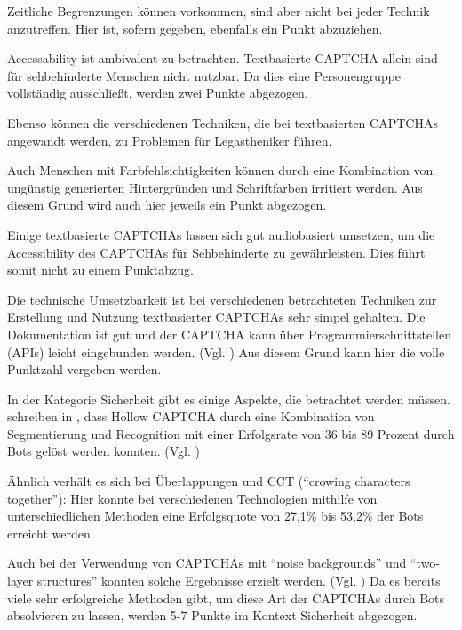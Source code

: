 Zeitliche Begrenzungen können vorkommen, sind aber nicht bei jeder Technik anzutreffen.
Hier ist, sofern gegeben, ebenfalls ein Punkt abzuziehen.

Accessability ist ambivalent zu betrachten.
Textbasierte CAPTCHA allein sind für sehbehinderte Menschen nicht nutzbar. 
Da dies eine Personengruppe vollständig ausschließt, werden zwei Punkte abgezogen.

Ebenso können die verschiedenen Techniken, die bei textbasierten CAPTCHAs angewandt werden, zu Problemen für Legastheniker führen.

Auch Menschen mit Farbfehlsichtigkeiten können durch eine Kombination von ungünstig generierten Hintergründen und Schriftfarben irritiert werden.
Aus diesem Grund wird auch hier jeweils ein Punkt abgezogen.

Einige textbasierte CAPTCHAs lassen sich gut audiobasiert umsetzen, 
um die Accessibility des CAPTCHAs für Sehbehinderte zu gewährleisten. 
Dies führt somit nicht zu einem Punktabzug.

Die technische Umsetzbarkeit ist bei verschiedenen betrachteten Techniken zur Erstellung und Nutzung textbasierter CAPTCHAs sehr simpel gehalten.
Die Dokumentation ist gut und der CAPTCHA kann über Programmierschnittstellen (APIs) leicht eingebunden werden. (Vgl. \cite{hcaptcha} \cite{phpcaptcha} \cite{reallysimplecaptcha})
Aus diesem Grund kann hier die volle Punktzahl vergeben werden.

In der Kategorie Sicherheit gibt es einige Aspekte, die betrachtet werden müssen.
\citeauthor{surveyofresearch} schreiben in , 
dass Hollow CAPTCHA durch eine Kombination von Segmentierung und Recognition %
mit einer Erfolgsrate von 36 bis 89 Prozent durch Bots gelöst werden konnten. (Vgl. \cite[p.76ff]{surveyofresearch}) %

Ähnlich verhält es sich bei Überlappungen und CCT (``crowing characters together''):
Hier konnte bei verschiedenen Technologien mithilfe von unterschiedlichen Methoden
eine Erfolgsquote von 27,1\% bis 53,2\% der Bots erreicht werden. \cite[p.76]{surveyofresearch} %

Auch bei der Verwendung von CAPTCHAs mit ``noise backgrounds'' und ``two-layer structures'' konnten solche Ergebnisse erzielt werden. 
(Vgl. \cite[p.76]{surveyofresearch})
Da es bereits viele sehr erfolgreiche Methoden gibt, um diese Art der CAPTCHAs durch Bots absolvieren zu lassen,
werden 5-7 Punkte im Kontext Sicherheit abgezogen. 

